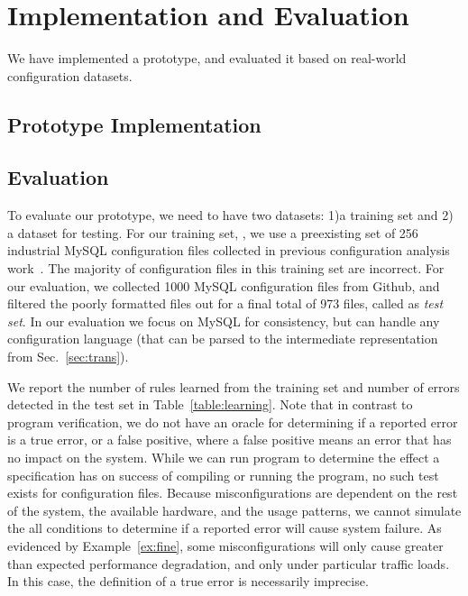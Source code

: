 
\section{Implementation and Evaluation}

We have implemented a \app prototype, and evaluated it based on
real-world configuration datasets.

\subsection{Prototype Implementation}


\subsection{Evaluation}

To evaluate our \app prototype, we need to have two datasets:
1)a training set and 2) a dataset for testing. 
For our training set, \trainingSet, we use a preexisting set of 256 
industrial MySQL configuration files collected in previous configuration 
analysis work~\cite{configdataset}.
The majority of configuration files in this training set are incorrect.
For our evaluation, we collected 1000 MySQL configuration files 
from Github, and filtered the poorly formatted files out for a final 
total of 973 files, called as {\em test set}.
In our evaluation we focus on MySQL for consistency, 
but \app can handle any configuration language (that can be parsed to 
the intermediate representation from Sec.~\ref{sec:trans}).

We report the number of rules learned from the training set and number of errors detected in the test set in Table~\ref{table:learning}.
Note that in contrast to program verification, we do not have an oracle for determining if a reported error is a true error, or a false positive, where a false positive means an error that has no impact on the system.
While we can run program to determine the effect a specification has on success of compiling or running the program, no such test exists for configuration files.
Because misconfigurations are dependent on the rest of the system, the available hardware, and the usage patterns, we cannot simulate the all conditions to determine if a reported error will cause system failure.
As evidenced by Example~\ref{ex:fine}, some misconfigurations will only cause greater than expected performance degradation, and only under particular traffic loads.
In this case, the definition of a true error is necessarily imprecise.

